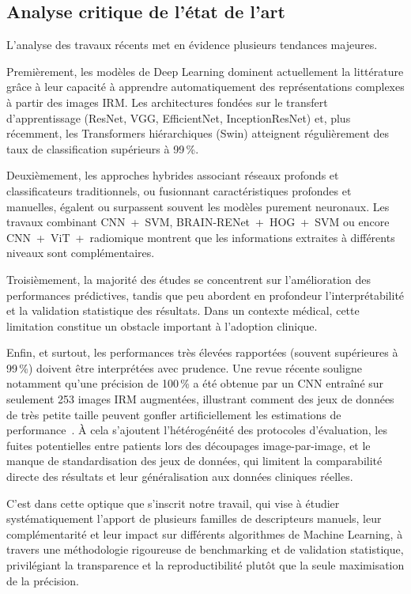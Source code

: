 \subsection{Analyse critique de l'état de l'art}
\label{sec:analyse-critique}

L'analyse des travaux récents met en évidence plusieurs tendances majeures.

Premièrement, les modèles de Deep Learning dominent actuellement la littérature grâce à leur
capacité à apprendre automatiquement des représentations complexes à partir des images IRM.
Les architectures fondées sur le transfert d'apprentissage (ResNet, VGG, EfficientNet,
InceptionResNet) et, plus récemment, les Transformers hiérarchiques (Swin) atteignent
régulièrement des taux de classification supérieurs à 99\,\%.

Deuxièmement, les approches hybrides associant réseaux profonds et classificateurs
traditionnels, ou fusionnant caractéristiques profondes et manuelles, égalent ou surpassent
souvent les modèles purement neuronaux. Les travaux combinant CNN~+~SVM, BRAIN-RENet~+~HOG~+~SVM
ou encore CNN~+~ViT~+~radiomique montrent que les informations extraites à différents niveaux
sont complémentaires.

Troisièmement, la majorité des études se concentrent sur l'amélioration des performances
prédictives, tandis que peu abordent en profondeur l'interprétabilité et la validation
statistique des résultats. Dans un contexte médical, cette limitation constitue un obstacle
important à l'adoption clinique.

Enfin, et surtout, les performances très élevées rapportées (souvent supérieures à 99\,\%)
doivent être interprétées avec prudence. Une revue récente souligne notamment qu'une précision
de 100\,\% a été obtenue par un CNN entraîné sur seulement 253 images IRM augmentées,
illustrant comment des jeux de données de très petite taille peuvent gonfler artificiellement
les estimations de performance~\cite{ref-review}. À cela s'ajoutent l'hétérogénéité des
protocoles d'évaluation, les fuites potentielles entre patients lors des découpages
image-par-image, et le manque de standardisation des jeux de données, qui limitent la
comparabilité directe des résultats et leur généralisation aux données cliniques réelles.

C'est dans cette optique que s'inscrit notre travail, qui vise à étudier systématiquement
l'apport de plusieurs familles de descripteurs manuels, leur complémentarité et leur impact
sur différents algorithmes de Machine Learning, à travers une méthodologie rigoureuse de
benchmarking et de validation statistique, privilégiant la transparence et la reproductibilité
plutôt que la seule maximisation de la précision.
